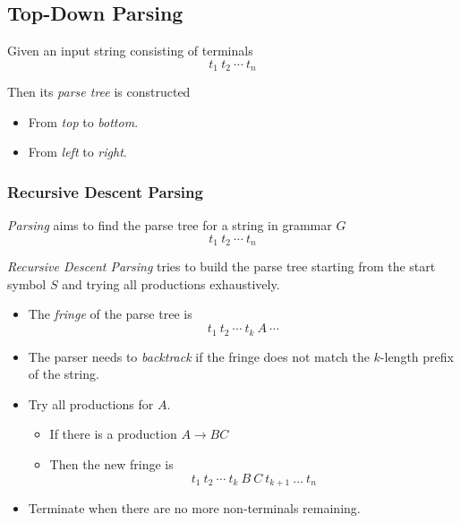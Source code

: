 \subsection{Top-Down Parsing}

\begin{definition}
    Given an input string consisting of terminals
    \begin{equation*}
        t_1\ t_2\ \cdots\ t_n
    \end{equation*}
    
    Then its \textit{parse tree} is constructed
    \begin{itemize}
        \item From \textit{top} to \textit{bottom}.
        \item From \textit{left} to \textit{right}.
    \end{itemize}
\end{definition}

\subsubsection{Recursive Descent Parsing}

\begin{definition}[Parsing]
    \textit{Parsing} aims to find the parse tree for a string in grammar $G$
    \begin{equation}
        t_1\ t_2\ \cdots\ t_n
    \end{equation}
\end{definition}

\begin{definition}
    \textit{Recursive Descent Parsing} tries to build the parse tree starting from the start symbol $S$ and trying all productions exhaustively.
    \begin{itemize}
        \item The \textit{fringe} of the parse tree is
            \begin{equation}
                t_1\ t_2\ \cdots\ t_k\ A\ \cdots
            \end{equation}
        \item The parser needs to \textit{backtrack} if the fringe does not match the $k$-length prefix of the string.
        \item Try all productions for $A$.
        \begin{itemize}
            \item If there is a production $A \to BC$
            \item Then the new fringe is
                \begin{equation}
                    t_1\ t_2\ \cdots\ t_k\ B\ C\ t_{k+1}\ \dots\ t_n
                \end{equation}
        \end{itemize}
        \item Terminate when there are no more non-terminals remaining.
    \end{itemize}
\end{definition}

